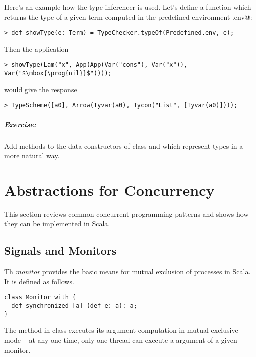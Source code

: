 \documentclass[11pt]{report}
\begin{document}
Here's an example how the type inferencer is used.
Let's define a function \verb@showType@ which returns the type of
a given term computed in the predefined environment
\verb@Predefined.env@:
\begin{verbatim}
> def showType(e: Term) = TypeChecker.typeOf(Predefined.env, e);
\end{verbatim}
Then the application
\begin{verbatim}
> showType(Lam("x", App(App(Var("cons"), Var("x")), Var("$\mbox{\prog{nil}}$"))));
\end{verbatim}
would give the response
\begin{verbatim}
> TypeScheme([a0], Arrow(Tyvar(a0), Tycon("List", [Tyvar(a0)])));
\end{verbatim}

\paragraph{Exercise:}
Add \verb@toString@ methods to the data constructors of class
\verb@Type@ and \verb@TypeScheme@ which represent types in a more
natural way.

\chapter{Abstractions for Concurrency}\label{sec:ex-concurrency}

This section reviews common concurrent programming patterns and shows
how they can be implemented in Scala.

\section{Signals and Monitors}

\example Th {\em monitor} provides the basic means for mutual exclusion
of processes in Scala. It is defined as follows.
\begin{verbatim}
class Monitor with {
  def synchronized [a] (def e: a): a;
}
\end{verbatim}
The \verb@synchronized@ method in class \verb@Monitor@ executes its
argument computation \verb@e@ in mutual exclusive mode -- at any one
time, only one thread can execute a \verb@synchronized@ argument of a
given monitor.
\end{document}

